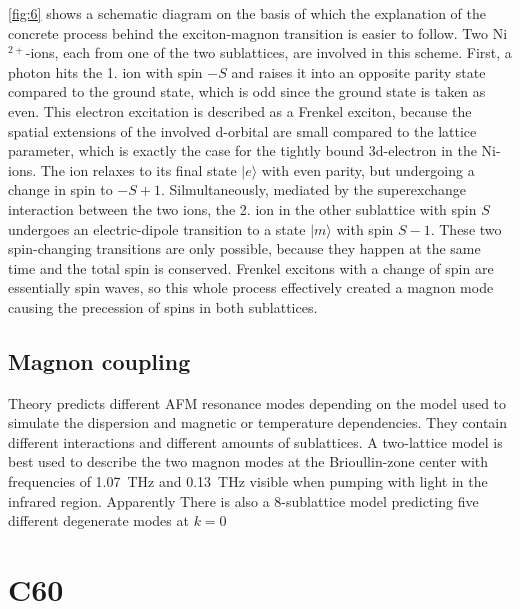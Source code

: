 \FloatBarrier
\autoref{fig:6} shows a schematic diagram on the basis of which the explanation of the concrete process behind the exciton-magnon transition is easier to follow.
Two Ni$^{2+}$-ions, each from one of the two sublattices, are involved in this scheme.
First, a photon hits the 1. ion with spin $-S$ and raises it into an opposite parity state compared to the ground state, which is odd since the ground state is taken as even.
This electron excitation is described as a Frenkel exciton, because the spatial extensions of the involved d-orbital are small compared to the lattice parameter, which is exactly the case for the tightly bound 3d-electron in the Ni-ions.
The ion relaxes to its final state $|e\rangle$ with even parity, but undergoing a change in spin to $-S+1$.
Silmultaneously, mediated by the superexchange interaction between the two ions, the 2. ion in the other sublattice with spin $S$ undergoes an electric-dipole transition to a state $|m\rangle$ with spin $S-1$.
These two spin-changing transitions are only possible, because they happen at the same time and the total spin is conserved.
Frenkel excitons with a change of spin are essentially spin waves, so this whole process effectively created a magnon mode causing the precession of spins in both sublattices.

\subsection{Magnon coupling}
\label{sec:mode_coupling}
Theory predicts different AFM resonance modes depending on the model used to simulate the dispersion and magnetic or temperature dependencies.
They contain different interactions and different amounts of sublattices.
A two-lattice model is best used to describe the two magnon modes at the Brioullin-zone center with frequencies of \qty{1.07}{THz} and \qty{0.13}{THz} visible when pumping with light in the infrared region.
Apparently
There is also a 8-sublattice model predicting five different degenerate modes at $k=0$ 

\section{C60}




